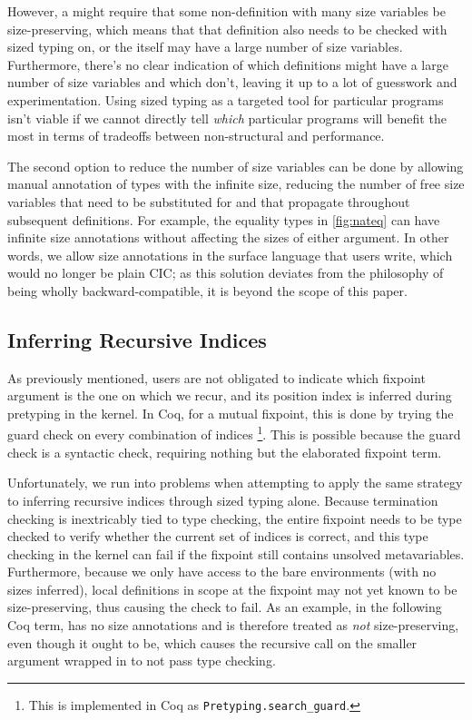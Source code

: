 However, a \cofixpoint might require that some non-\corecursive definition with many size variables be size-preserving,
which means that that definition also needs to be checked with sized typing on,
or the \cofixpoint itself may have a large number of size variables.
Furthermore, there's no clear indication of which definitions might have a large number of size variables and which don't,
leaving it up to a lot of guesswork and experimentation.
Using sized typing as a targeted tool for particular programs isn't viable
if we cannot directly tell \emph{which} particular programs will benefit the most
in terms of tradeoffs between non-structural \corecursion and performance.

The second option to reduce the number of size variables can be done by allowing manual annotation of \coinductive types with the infinite size,
reducing the number of free size variables that need to be substituted for
and that propagate throughout subsequent definitions.
For example, the equality types in \autoref{fig:nateq} can have infinite size annotations
without affecting the sizes of either  argument.
In other words, we allow size annotations in the surface language that users write,
which would no longer be plain CIC;
as this solution deviates from the philosophy of being wholly backward-compatible,
it is beyond the scope of this paper.

\subsection{Inferring Recursive Indices}\label{sec:impl:recind}

As previously mentioned, users are not obligated to indicate which fixpoint argument is the one on which we recur,
and its position index is inferred during pretyping in the kernel.
In Coq, for a mutual fixpoint, this is done by trying the guard check on every combination of indices%
\footnote{This is implemented in Coq as \texttt{Pretyping.search\_guard}.}.
This is possible because the guard check is a syntactic check, requiring nothing but the elaborated fixpoint term.

Unfortunately, we run into problems when attempting to apply the same strategy to inferring recursive indices through sized typing alone.
Because termination checking is inextricably tied to type checking,
the entire fixpoint needs to be type checked to verify whether the current set of indices is correct,
and this type checking in the kernel can fail if the fixpoint still contains unsolved metavariables.
Furthermore, because we only have access to the bare environments (\ie with no sizes inferred),
local definitions in scope at the fixpoint may not yet known to be size-preserving,
thus causing the check to fail.
As an example, in the following Coq term,  has no size annotations and is therefore treated as \emph{not} size-preserving,
even though it ought to be, which causes the recursive call on the smaller argument wrapped in  to not pass type checking.

